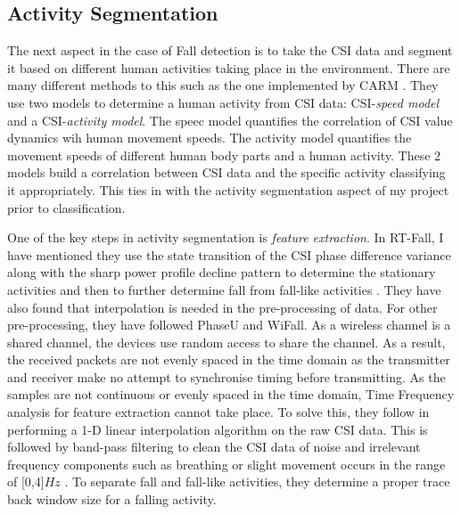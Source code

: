 \subsection{Activity Segmentation}
The next aspect in the case of Fall detection is to take the CSI data and segment it based on different human activities taking place in the environment. There are many different methods to this such as the one implemented by CARM \citep{CARM}. They use two models to determine a human activity from CSI data: CSI-\textit{speed model} and a CSI-\textit{activity model}. The speec model quantifies the correlation of CSI value dynamics wih human movement speeds. The activity model quantifies the movement speeds of different human body parts and a human activity. These 2 models build a correlation between CSI data and the specific activity classifying it appropriately. This ties in with the activity segmentation aspect of my project prior to classification. \par
One of the key steps in activity segmentation is \textit{feature extraction}. In RT-Fall, I have mentioned they use the state transition of the CSI phase difference variance along with the sharp power profile decline pattern to determine the stationary activities and then to further determine fall from fall-like activities \citep{RTFall}. They have also found that interpolation is needed in the pre-processing of data. For other pre-processing, they have followed PhaseU and WiFall. As a wireless channel is a shared channel, the devices use random access to share the channel. As a result, the received packets are not evenly spaced in the time domain as the transmitter and receiver make no attempt to synchronise timing before transmitting. As the samples are not continuous or evenly spaced in the time domain, Time Frequency analysis for feature extraction cannot take place. To solve this, they follow \cite{gestureCSI} in performing a 1-D linear interpolation algorithm on the raw CSI data. This is followed by band-pass filtering to clean the CSI data of noise and irrelevant frequency components such as breathing or slight movement occurs in the range of [0,4]$Hz$ \citep{RTFall}. To separate fall and fall-like activities, they determine a proper trace back window size for a falling activity. 
